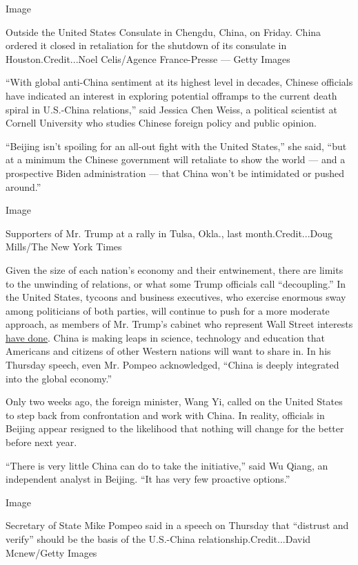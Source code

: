 Image

Outside the United States Consulate in Chengdu, China, on Friday. China
ordered it closed in retaliation for the shutdown of its consulate in
Houston.Credit...Noel Celis/Agence France-Presse --- Getty Images

``With global anti-China sentiment at its highest level in decades,
Chinese officials have indicated an interest in exploring potential
offramps to the current death spiral in U.S.-China relations,'' said
Jessica Chen Weiss, a political scientist at Cornell University who
studies Chinese foreign policy and public opinion.

``Beijing isn't spoiling for an all-out fight with the United States,''
she said, ``but at a minimum the Chinese government will retaliate to
show the world --- and a prospective Biden administration --- that China
won't be intimidated or pushed around.''

Image

Supporters of Mr. Trump at a rally in Tulsa, Okla., last
month.Credit...Doug Mills/The New York Times

Given the size of each nation's economy and their entwinement, there are
limits to the unwinding of relations, or what some Trump officials call
``decoupling.'' In the United States, tycoons and business executives,
who exercise enormous sway among politicians of both parties, will
continue to push for a more moderate approach, as members of Mr. Trump's
cabinet who represent Wall Street interests
\href{https://www.nytimes.com/2020/04/02/us/politics/coronavirus-trump-china.html}{have
done}. China is making leaps in science, technology and education that
Americans and citizens of other Western nations will want to share in.
In his Thursday speech, even Mr. Pompeo acknowledged, ``China is deeply
integrated into the global economy.''

Only two weeks ago, the foreign minister, Wang Yi, called on the United
States to step back from confrontation and work with China. In reality,
officials in Beijing appear resigned to the likelihood that nothing will
change for the better before next year.

``There is very little China can do to take the initiative,'' said Wu
Qiang, an independent analyst in Beijing. ``It has very few proactive
options.''

Image

Secretary of State Mike Pompeo said in a speech on Thursday that
``distrust and verify'' should be the basis of the U.S.-China
relationship.Credit...David Mcnew/Getty Images

